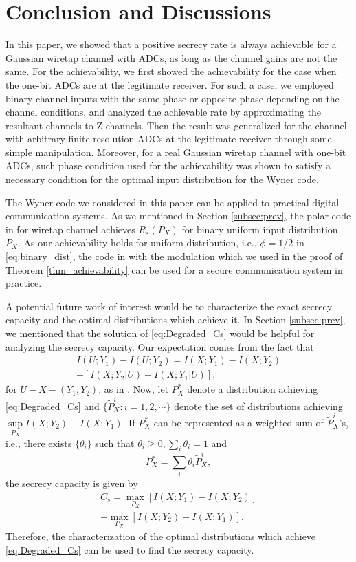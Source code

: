 \documentclass[journal]{IEEEtran}
\begin{document}
\section{Conclusion and Discussions}\label{sec:discussion}
In this paper, we showed that a positive secrecy rate is always achievable for a Gaussian wiretap channel with ADCs, as long as the channel gains are not the same. For the achievability, we first showed the achievability for the case when the one-bit ADCs are at the legitimate receiver. For such a case, we employed binary channel inputs with the same phase or opposite phase depending on the channel conditions, and analyzed the achievable rate by approximating the resultant channels to Z-channels. Then the result was generalized  for the channel with arbitrary finite-resolution ADCs at the legitimate receiver through some simple manipulation. Moreover, for a real Gaussian wiretap channel with one-bit ADCs, such phase condition used for the achievability was shown to satisfy a necessary condition for the optimal input distribution for the Wyner code.

The Wyner code we considered in this paper can be applied to practical digital communication systems.  As we mentioned in Section \ref{subsec:prev}, the polar code in \cite{MV11} for wiretap channel achieves $R_s(P_X)$ for binary uniform input distribution $P_X$. As our achievability holds for uniform distribution, i.e., ${\phi=1/2}$ in \eqref{eq:binary_dist}, the code in \cite{MV11} with the modulation which we used in the proof of Theorem \ref{thm_achievability} can be used for a secure communication system in practice.

A potential future work of interest would be to characterize the exact secrecy capacity and the optimal distributions which achieve it.
In Section \ref{subsec:prev}, we mentioned that the solution of \eqref{eq:Degraded_Cs} would be helpful for analyzing the secrecy capacity. 
Our expectation comes from the fact that
\begin{multline}
    I(U;Y_1)-I(U;Y_2) = I(X;Y_1)-I(X;Y_2)
    \\ + \left[ I(X;Y_2|U) - I(X;Y_1|U) \right],
\end{multline}
for $U-X-(Y_1,Y_2)$, as in \cite{cyclic_symmetry}. Now, let $P_X^*$ denote a distribution achieving \eqref{eq:Degraded_Cs} and $\{\tilde{P}_X^i: i=1,2,\cdots \}$ denote the set of distributions achieving $\sup\limits_{P_X}I(X;Y_2)-I(X;Y_1)$. If $P_X^*$ can be represented as a weighted sum of $\tilde{P}_X^i$'s, i.e., there exists $\{\theta_i\}$ such that $\theta_i \geq 0, \sum\limits_i \theta_i = 1$ and 
\begin{equation}
    P_X^* = \sum\limits_i \theta_i \tilde{P}_X^i,
\end{equation}
the secrecy capacity is given by
\begin{multline}
    C_s = \max\limits_{P_X} [I(X;Y_1) - I(X;Y_2)] \\ + \max\limits_{P_X} [I(X;Y_2)-I(X;Y_1)]. 
\end{multline}
Therefore, the characterization of the optimal distributions which achieve \eqref{eq:Degraded_Cs} can be used to find the secrecy capacity.
\end{document}
